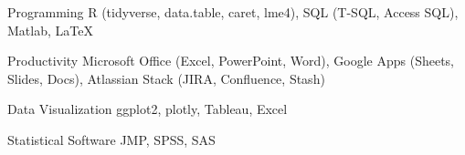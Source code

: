 

\begin{cvskills}

  \cvskill
    {Programming} %
    {R (tidyverse, data.table, caret, lme4), SQL (T-SQL, Access SQL), Matlab, \LaTeX} %

  \cvskill
    {Productivity} %
    {Microsoft Office (Excel, PowerPoint, Word), Google Apps (Sheets, Slides, Docs), Atlassian Stack (JIRA, Confluence, Stash)} %

  \cvskill
    {Data Visualization} %
    {ggplot2, plotly, Tableau, Excel} %

  \cvskill
    {Statistical Software} %
    {JMP, SPSS, SAS} %

\end{cvskills}
